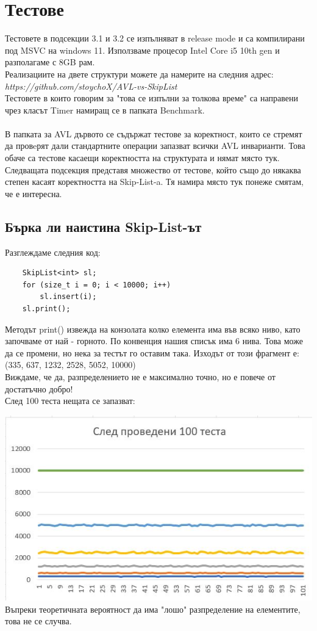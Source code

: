 \documentclass[a4paper,12pt,fleqn]{article}
\begin{document}
	\section{Тестове}
	Тестовете в подсекции 3.1 и 3.2 се изпълняват в release mode и са компилирани под MSVC на windows 11. Използваме процесор Intel Core i5 10th gen и разполагаме с 8GB рам.\\
	Реализациите на двете структури можете да намерите на следния адрес:\\
	\textit{https://github.com/stoychoX/AVL-vs-SkipList}
	\\Тестовете в които говорим за "това се изпълни за толкова време" са направени чрез класът Timer намиращ се в папката Benchmark.\\
	\\В папката за AVL дървото се съдържат тестове за коректност, които се стремят да провeрят дали стандартните операции запазват всички AVL инварианти. 
	Това обаче са тестове касаещи коректността на структурата и нямат място тук. Следващата подсекция представя множество от тестове, който също до някаква степен касаят коректността на Skip-List-a. Тя намира място тук понеже смятам, че е интересна.
	\subsection{Бърка ли наистина Skip-List-ът}
	Разглеждаме следния код:
	\begin{lstlisting}
	SkipList<int> sl;
	for (size_t i = 0; i < 10000; i++)
		sl.insert(i);
	sl.print();
	\end{lstlisting}
	Методът print() извежда на конзолата колко елемента има във всяко ниво, като започваме от най - горното. По конвенция нашия списък има 6 нива. Това може да се промени, но нека за тестът го оставим така. Изходът от този фрагмент е:
	(335, 637, 1232, 2528, 5052, 10000)
	\\Виждаме, че да, разпределението не е максимално точно, но е повече от достатъчно добро!\\
	След 100 теста нещата се запазват:
	
	\includegraphics[scale=0.45]{insert-tests.jpg}\\
	Въпреки теоретичната вероятност да има "лошо" разпределение на елементите, това не се случва.
\end{document}
